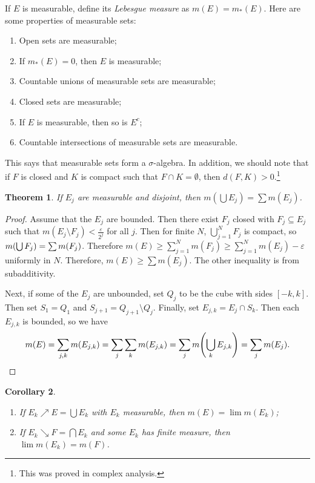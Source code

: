 \documentclass[leqno, openany]{memoir}
\newtheorem{thm}{Theorem}[chapter]
\newtheorem{cor}[thm]{Corollary}
\theoremstyle{definition}
\theoremstyle{remark}
\theoremstyle{plain}
\theoremstyle{definition}
\theoremstyle{remark}
\newcommand{\ep}{\varepsilon}
\begin{document}
If $E$ is measurable, define its \textit{Lebesgue measure} as $m(E) = m_*(E)$.
Here are some properties of measurable sets: \begin{enumerate} \item Open sets
    are measurable; \item If $m_*(E) = 0$, then $E$ is measurable; \item
    Countable unions of measurable sets are measurable; \item Closed sets are
    measurable; \item If $E$ is measurable, then so is $E^c$; \item Countable
    intersections of measurable sets are measurable.  \end{enumerate}

This says that measurable sets form a $\sigma$-algebra. In addition, we should
note that if $F$ is closed and $K$ is compact such that $F \cap K = \emptyset$,
then $d(F,K) > 0$.\footnote{This was proved in complex analysis.}

\begin{thm} If $E_j$ are measurable and disjoint, then $m(\bigcup E_j) = \sum
m(E_j)$.  \end{thm}

\begin{proof} Assume that the $E_j$ are bounded. Then there exist $F_j$ closed
    with $F_j \subseteq E_j$ such that $m(E_j \setminus F_j) < \frac{\ep}{2^j}$
    for all $j$. Then for finite $N$, $\bigcup_{j=1}^N F_j$ is compact, so
    $m\qty(\bigcup F_j) = \sum m(F_j)$. Therefore $m(E) \geq \sum_{j=1}^N
    m(F_j) \geq \sum_{j=1}^N m(E_j) - \ep$ uniformly in $N$. Therefore, $m(E)
    \geq \sum m(E_j)$. The other inequality is from subadditivity.

    Next, if some of the $E_j$ are unbounded, set $Q_j$ to be the cube with
    sides $[-k,k]$. Then set $S_1 = Q_1$ and $S_{j+1} = Q_{j+1} \setminus Q_j$.
    Finally, set $E_{j,k} = E_j \cap S_k$. Then each $E_{j,k}$ is bounded, so
    we have \[ m(E) = \sum_{j,k} m(E_{j,k}) = \sum_j \sum_k m(E_{j,k}) = \sum_j
    m\qty(\bigcup_k E_{j,k}) = \sum_j m(E_j). \qedhere \] \end{proof}

\begin{cor} \begin{enumerate} \item If $E_k \nearrow E = \bigcup E_k$ with
$E_k$ measurable, then $m(E) = \lim m(E_k)$; \item If $E_k \searrow F = \bigcap
E_k$ and some $E_k$ has finite measure, then $\lim m(E_k) = m(F)$.
\end{enumerate} \end{cor}
\end{document}
